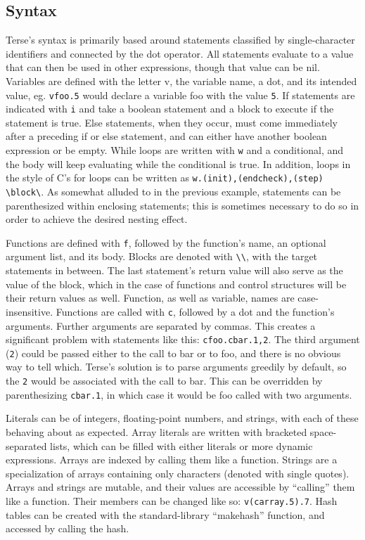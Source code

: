 \documentclass[12pt]{article}
\newcommand{\code}[1]{\texttt{#1}}
\newcommand{\bs}{\textbackslash}
\begin{document}

\subsection{Syntax}

Terse's syntax is primarily based around statements classified by
single-character identifiers and connected by the dot operator. All
statements evaluate to a value that can then be used in other
expressions, though that value can be nil. Variables are defined with
the letter v, the variable name, a dot, and its intended value,
eg. \code{vfoo.5} would declare a variable foo with the value
\code{5}. If statements are indicated with \code{i} and take a boolean
statement and a block to execute if the statement is true. Else
statements, when they occur, must come immediately after a preceding
if or else statement, and can either have another boolean expression
or be empty. While loops are written with \code{w} and a conditional,
and the body will keep evaluating while the conditional is true. In
addition, loops in the style of C's for loops can be written as
\code{w.(init),(endcheck),(step) \bs block\bs}. As somewhat alluded to
in the previous example, statements can be parenthesized within
enclosing statements; this is sometimes necessary to do so in order to
achieve the desired nesting effect.

Functions are defined with \code{f}, followed by the function's name,
an optional argument list, and its body. Blocks are denoted with
\code{\bs \bs}, with the target statements in between. The last
statement's return value will also serve as the value of the block,
which in the case of functions and control structures will be their
return values as well. Function, as well as variable, names are
case-insensitive. Functions are called with \code{c}, followed by a
dot and the function's arguments. Further arguments are separated by
commas. This creates a significant problem with statements like this:
\code{cfoo.cbar.1,2}. The third argument (\code{2}) could be passed
either to the call to bar or to foo, and there is no obvious way to
tell which. Terse's solution is to parse arguments greedily by
default, so the \code{2} would be associated with the call to
bar. This can be overridden by parenthesizing \code{cbar.1}, in which
case it would be foo called with two arguments.

Literals can be of integers, floating-point numbers, and strings, with
each of these behaving about as expected.  Array literals are written
with bracketed space-separated lists, which can be filled with either
literals or more dynamic expressions. Arrays are indexed by calling
them like a function. Strings are a specialization of arrays
containing only characters (denoted with single quotes). Arrays and
strings are mutable, and their values are accessible by ``calling''
them like a function. Their members can be changed like so:
\code{v(carray.5).7}. Hash tables can be created with the
standard-library ``makehash'' function, and accessed by calling the
hash.
\end{document}
